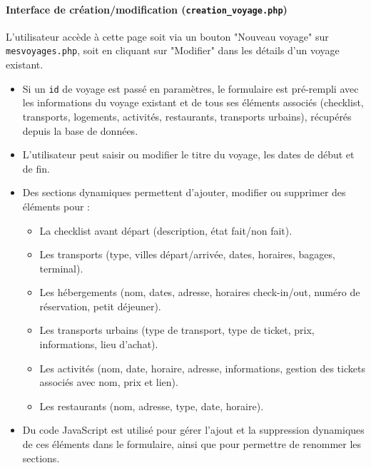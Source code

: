 \documentclass[a4paper,12pt]{article}
\begin{document}
\paragraph{Interface de création/modification (\texttt{creation\_voyage.php})}
L'utilisateur accède à cette page soit via un bouton "Nouveau voyage" sur \texttt{mesvoyages.php}, soit en cliquant sur "Modifier" dans les détails d'un voyage existant.
\begin{itemize}
    \item Si un \texttt{id} de voyage est passé en paramètres, le formulaire est pré-rempli avec les informations du voyage existant et de tous ses éléments associés (checklist, transports, logements, activités, restaurants, transports urbains), récupérés depuis la base de données.
    \item L'utilisateur peut saisir ou modifier le titre du voyage, les dates de début et de fin.
    \item Des sections dynamiques permettent d'ajouter, modifier ou supprimer des éléments pour :
    \begin{itemize}
        \item La checklist avant départ (description, état fait/non fait).
        \item Les transports (type, villes départ/arrivée, dates, horaires, bagages, terminal).
        \item Les hébergements (nom, dates, adresse, horaires check-in/out, numéro de réservation, petit déjeuner).
        \item Les transports urbains (type de transport, type de ticket, prix, informations, lieu d'achat).
        \item Les activités (nom, date, horaire, adresse, informations, gestion des tickets associés avec nom, prix et lien).
        \item Les restaurants (nom, adresse, type, date, horaire).
    \end{itemize}
    \item Du code JavaScript est utilisé pour gérer l'ajout et la suppression dynamiques de ces éléments dans le formulaire, ainsi que pour permettre de renommer les sections.
\end{itemize}
\end{document}
